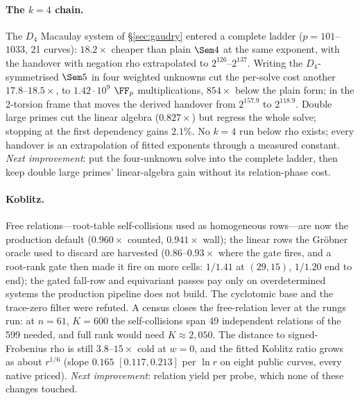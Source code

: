 \paragraph{The $k=4$ chain.} The $D_4$ Macaulay system of
\S\ref{sec:gaudry} entered a complete ladder ($p=101$--$1033$, 21 curves):
$18.2\times$ cheaper than plain $\Sem4$ at the same exponent, with the
handover with negation rho extrapolated to $2^{126}$--$2^{137}$. Writing
the $D_4$-symmetrised $\Sem5$ in four weighted unknowns cut the per-solve
cost another $17.8$--$18.5\times$, to $1.42\cdot10^9$ $\FF_p$
multiplications, $854\times$ below the plain form; in the 2-torsion frame
that moves the derived handover from $2^{157.9}$ to $2^{118.9}$. Double
large primes cut the linear algebra ($0.827\times$) but regress the whole
solve; stopping at the first dependency gains $2.1\%$. No $k=4$ run below
rho exists; every handover is an extrapolation of fitted exponents through
a measured constant. \emph{Next improvement}: put the four-unknown solve
into the complete ladder, then keep double large primes' linear-algebra
gain without its relation-phase cost.

\paragraph{Koblitz.} Free relations---root-table self-collisions used as
homogeneous rows---are now the production default ($0.960\times$ counted,
$0.941\times$ wall); the linear rows the Gr\"obner oracle used to discard
are harvested ($0.86$--$0.93\times$ where the gate fires, and a root-rank
gate then made it fire on more cells: $1/1.41$ at $(29,15)$, $1/1.20$ end
to end); the gated
fall-row and equivariant passes pay only on overdetermined systems the
production pipeline does not build. The cyclotomic base and the trace-zero
filter were refuted. A census closes the free-relation lever at the rungs
run: at $n=61$, $K=600$ the self-collisions span 49 independent relations of
the 599 needed, and full rank would need $K\approx2{,}050$. The distance to
signed-Frobenius rho is still $3.8$--$15\times$ cold at $w=0$, and the
fitted Koblitz ratio grows as about $r^{1/6}$ (slope $0.165$ $[0.117,0.213]$
per $\ln r$ on eight public curves, every native priced).
\emph{Next improvement}: relation yield per probe, which none of these
changes touched.

